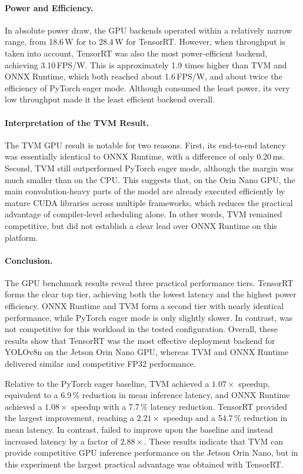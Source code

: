 \documentclass[12pt,a4paper]{report}
\begin{document}
\paragraph{Power and Efficiency.}
In absolute power draw, the GPU backends operated within a relatively narrow
range, from 18.6\,W for  to 28.4\,W for TensorRT.
However, when throughput is taken into account, TensorRT was also the most
power-efficient backend, achieving 3.10\,FPS/W. This is approximately
1.9 times higher than TVM and ONNX Runtime, which both reached about
1.6\,FPS/W, and about twice the efficiency of PyTorch eager mode. Although
 consumed the least power, its very low throughput made
it the least efficient backend overall.

\paragraph{Interpretation of the TVM Result.}
The TVM GPU result is notable for two reasons. First, its end-to-end latency
was essentially identical to ONNX Runtime, with a difference of only 0.20\,ms.
Second, TVM still outperformed PyTorch eager mode, although the margin was much
smaller than on the CPU. This suggests that, on the Orin Nano GPU, the main
convolution-heavy parts of the model are already executed efficiently by mature
CUDA libraries across multiple frameworks, which reduces the practical
advantage of compiler-level scheduling alone. In other words, TVM remained
competitive, but did not establish a clear lead over ONNX Runtime on this
platform.

\paragraph{Conclusion.}
The GPU benchmark results reveal three practical performance tiers. TensorRT
forms the clear top tier, achieving both the lowest latency and the highest
power efficiency. ONNX Runtime and TVM form a second tier with nearly identical
performance, while PyTorch eager mode is only slightly slower. In contrast,
 was not competitive for this workload in the tested
configuration. Overall, these results show that TensorRT was the most effective
deployment backend for YOLOv8n on the Jetson Orin Nano GPU, whereas TVM and
ONNX Runtime delivered similar and competitive FP32 performance.

Relative to the PyTorch eager baseline, TVM achieved a \(1.07\times\) speedup,
equivalent to a 6.9\,\% reduction in mean inference latency, and ONNX Runtime
achieved a \(1.08\times\) speedup with a 7.7\,\% latency reduction. TensorRT
provided the largest improvement, reaching a \(2.21\times\) speedup and a
54.7\,\% reduction in mean latency. In contrast,  failed
to improve upon the baseline and instead increased latency by a factor of
\(2.88\times\). These results indicate that TVM can provide competitive GPU
inference performance on the Jetson Orin Nano, but in this experiment the
largest practical advantage was obtained with TensorRT.
\end{document}

